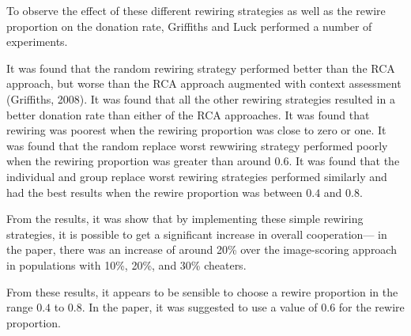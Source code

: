 To observe the effect of these different rewiring strategies as well as the
rewire proportion on the donation rate, Griffiths and Luck performed a number
of experiments.

It was found that the random rewiring strategy performed better than the RCA
approach, but worse than the RCA approach augmented with context assessment
(Griffiths, 2008). It was found that all the other rewiring strategies resulted
in a better donation rate than either of the RCA approaches. It was found that
rewiring was poorest when the rewiring proportion was close to zero or one.
It was found that the random replace worst rewwiring strategy performed poorly
when the rewiring proportion was greater than around $0.6$. It was found that
the individual and group replace worst rewiring strategies performed similarly
and had the best results when the rewire proportion was between $0.4$ and $0.8$.

From the results, it was show that by implementing these simple rewiring
strategies, it is possible to get a significant increase in overall cooperation---
in the paper, there was an increase of around 20\% over the image-scoring approach
in populations with 10\%, 20\%, and 30\% cheaters.

From these results, it appears to be sensible to choose a rewire proportion in
the range $0.4$ to $0.8$. In the paper, it was suggested to use a value of $0.6$
for the rewire proportion.
